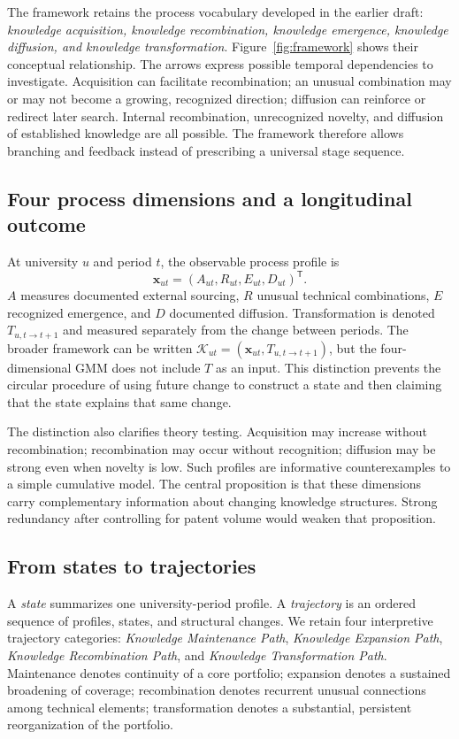 The framework retains the process vocabulary developed in the earlier draft:
\emph{knowledge acquisition, knowledge recombination, knowledge emergence,
knowledge diffusion, and knowledge transformation}. Figure~\ref{fig:framework}
shows their conceptual relationship. The arrows express possible temporal
dependencies to investigate. Acquisition can facilitate recombination; an unusual
combination may or may not become a growing, recognized direction; diffusion can
reinforce or redirect later search. Internal recombination, unrecognized novelty,
and diffusion of established knowledge are all possible. The framework therefore
allows branching and feedback instead of prescribing a universal stage sequence.



\subsection{Four process dimensions and a longitudinal outcome}
At university $u$ and period $t$, the observable process profile is
\begin{equation}
 \mathbf{x}_{ut}=(A_{ut},R_{ut},E_{ut},D_{ut})^{\mathsf T}.
 \label{eq:profile}
\end{equation}
$A$ measures documented external sourcing, $R$ unusual technical combinations,
$E$ recognized emergence, and $D$ documented diffusion. Transformation is denoted
$T_{u,t\rightarrow t+1}$ and measured separately from the change between periods.
The broader framework can be written
$\mathcal{K}_{ut}=(\mathbf{x}_{ut},T_{u,t\rightarrow t+1})$,
but the four-dimensional GMM does not include $T$ as an input. This distinction
prevents the circular procedure of using future change to construct a state and
then claiming that the state explains that same change.

The distinction also clarifies theory testing. Acquisition may increase without
recombination; recombination may occur without recognition; diffusion may be
strong even when novelty is low. Such profiles are informative counterexamples
to a simple cumulative model. The central proposition is that these dimensions
carry complementary information about changing knowledge structures. Strong
redundancy after controlling for patent volume would weaken that proposition.

\subsection{From states to trajectories}
A \emph{state} summarizes one university-period profile. A \emph{trajectory} is an
ordered sequence of profiles, states, and structural changes. We retain four
interpretive trajectory categories: \emph{Knowledge Maintenance Path},
\emph{Knowledge Expansion Path}, \emph{Knowledge Recombination Path}, and
\emph{Knowledge Transformation Path}. Maintenance denotes continuity of a core
portfolio; expansion denotes a sustained broadening of coverage; recombination
denotes recurrent unusual connections among technical elements; transformation
denotes a substantial, persistent reorganization of the portfolio.

